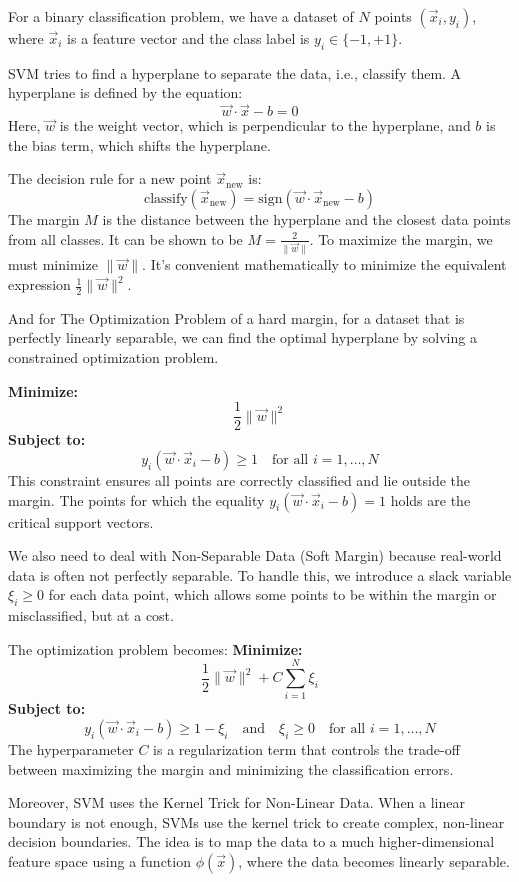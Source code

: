 \documentclass[12pt,a4paper]{article}
\begin{document}
	For a binary classification problem, we have a dataset of $N$ points $(\vec{x}_i, y_i)$, where $\vec{x}_i$ is a feature vector and the class label is $y_i \in \{-1, +1\}$.
	
	SVM tries to find a hyperplane to separate the data, i.e., classify them. A hyperplane is defined by the equation:
	\[
	\vec{w} \cdot \vec{x} - b = 0
	\]
	Here, $\vec{w}$ is the weight vector, which is perpendicular to the hyperplane, and $b$ is the bias term, which shifts the hyperplane.
	
	The decision rule for a new point $\vec{x}_{\text{new}}$ is:
	\[
	\text{classify}(\vec{x}_{\text{new}}) = \text{sign}(\vec{w} \cdot \vec{x}_{\text{new}} - b)
	\]
	The margin $M$ is the distance between the hyperplane and the closest data points from all classes. It can be shown to be $M = \frac{2}{\|\vec{w}\|}$. To maximize the margin, we must minimize $\|\vec{w}\|$. It's convenient mathematically to minimize the equivalent expression $\frac{1}{2}\|\vec{w}\|^2$.
	
	And for The Optimization Problem of a hard margin, for a dataset that is perfectly linearly separable, we can find the optimal hyperplane by solving a constrained optimization problem.
	
	\textbf{Minimize:}
	\[
	\frac{1}{2} \|\vec{w}\|^2
	\]
	\textbf{Subject to:}
	\[
	y_i(\vec{w} \cdot \vec{x}_i - b) \ge 1 \quad \text{for all } i=1, \dots, N
	\]
	This constraint ensures all points are correctly classified and lie outside the margin. The points for which the equality $y_i(\vec{w} \cdot \vec{x}_i - b) = 1$ holds are the critical support vectors.
	
	We also need to deal with Non-Separable Data (Soft Margin) because real-world data is often not perfectly separable. To handle this, we introduce a slack variable $\xi_i \ge 0$ for each data point, which allows some points to be within the margin or misclassified, but at a cost.
	
	The optimization problem becomes:
	\textbf{Minimize:}
	\[
	\frac{1}{2} \|\vec{w}\|^2 + C \sum_{i=1}^{N} \xi_i
	\]
	\textbf{Subject to:}
	\[
	y_i(\vec{w} \cdot \vec{x}_i - b) \ge 1 - \xi_i \quad \text{and} \quad \xi_i \ge 0 \quad \text{for all } i=1, \dots, N
	\]
	The hyperparameter $C$ is a regularization term that controls the trade-off between maximizing the margin and minimizing the classification errors.
	
	Moreover, SVM uses the Kernel Trick for Non-Linear Data. When a linear boundary is not enough, SVMs use the kernel trick to create complex, non-linear decision boundaries. The idea is to map the data to a much higher-dimensional feature space using a function $\phi(\vec{x})$, where the data becomes linearly separable.
	
\end{document}
